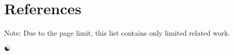 \documentclass[a4paper,11pt]{article}
\begin{document}
\newpage


\section{References}
Note: Due to the page limit, this list contains only limited related work.
\begingroup
\renewcommand{\section}[2]{}%
\\[0.3cm]


\begin{center}
\vspace{1cm}
\(\yinyang\)
\end{center}
\end{document}
